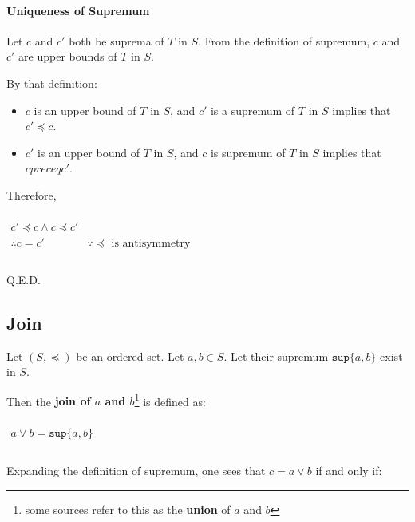 \paragraph{Uniqueness of Supremum}

Let $c$ and $c'$ both be suprema of $T$ in $S$. From the definition of
supremum, $c$ and $c'$ are upper bounds of $T$ in $S$.

By that definition:

\begin{itemize}
\item $c$ is an upper bound of $T$ in $S$, and $c'$ is a supremum of
  $T$ in $S$ implies that $c' \preceq c$.
\item $c'$ is an upper bound of $T$ in $S$, and $c$ is supremum of $T$
  in $S$ implies that $c preceq c'$.
\end{itemize}

Therefore,

\begin{math}
  \begin{array}{ll}
    \\
    c' \preceq c \land c \preceq c'\\
    \therefore c = c' & \because \preceq \text{ is antisymmetry}\\
    \\
  \end{array}
\end{math}

Q.E.D.


\subsection{Join}
\label{sec:join}

Let $(S, \preceq)$ be an ordered set. Let $a, b \in S$. Let their
supremum $\mathtt{sup} \{a, b\}$ exist in $S$.

Then the \textbf{join of $a$ and $b$}\footnote{some sources refer to
  this as the \textbf{union} of $a$ and $b$} is defined as:

\begin{math}
  \begin{array}{c}
    \\
    a \vee b = \mathtt{sup} \{ a, b \}\\
    \\
  \end{array}
\end{math}

Expanding the definition of supremum, one sees that $c = a \vee b$ if
and only if:

